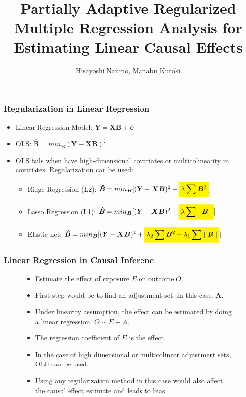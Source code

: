 \documentclass{beamer}
\title{Partially Adaptive Regularized Multiple Regression Analysis for Estimating Linear Causal Effects}
\author{Hisayoshi Nanmo, Manabu Kuroki}
\date{}
\newcommand{\mathcolorbox}[2]{\colorbox{#1}{$\displaystyle #2$}}
\begin{document}
\maketitle

\begin{frame}
	\frametitle{Regularization in Linear Regression}
	\begin{itemize}
		\item Linear Regression Model: $ \bm{Y} = \bm{XB} + \bm{e} $
		\item OLS: $ \bm{\hat{B}} = min_{\bm{B}} (\bm{Y} - \bm{XB})^2 $
		\item OLS fails when have high-dimensional covariates or multicolinearity in covariates. Regularization can be used:
			\begin{itemize}
				\item Ridge Regression (L2): $ \bm{\hat{B}} = min_{\bm{B}} [(\bm{Y}-\bm{XB})^2 + \mathcolorbox{yellow}{\lambda \sum \bm{B}^2}] $
				\item Lasso Regression (L1): $ \bm{\hat{B}} = min_{\bm{B}} [(\bm{Y}-\bm{XB})^2 + \mathcolorbox{yellow}{\lambda \sum \mid \bm{B} \mid}] $
				\item Elastic net: $ \bm{\hat{B}} = min_{\bm{B}} [(\bm{Y} - \bm{XB})^2 + \mathcolorbox{yellow}{\lambda_2 \sum \bm{B}^2 + \lambda_1 \sum \mid \bm{B} \mid}] $
			\end{itemize}
	\end{itemize}
\end{frame}

\begin{frame}
	\frametitle{Linear Regression in Causal Inferene}
	\begin{figure}
		\centering
		\begin{itemize}
			\item Estimate the effect of exposure $ E $ on outcome $ O $.
			\item First step would be to find an adjustment set. In this case, $ \bm{A} $.
			\item Under linearity assumption, the effect can be estimated by doing a 
				linear regression: $ O \sim E + A $.
			\item The regression coefficient of $ E $ is the effect.
			\item In the case of high dimensional or multicolinear
				adjustment sets, OLS can be used.
			\item Using any regularization method in this case
				would also affect the causal effect estimate
				and leads to bias.
		\end{itemize}
	\end{figure}
\end{frame}
\end{document}
